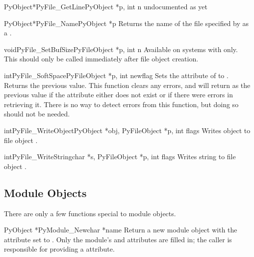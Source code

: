 \documentclass{manual}
\begin{document}
\begin{cfuncdesc}{PyObject*}{PyFile_GetLine}{PyObject *p, int n}
undocumented as yet
\end{cfuncdesc}

\begin{cfuncdesc}{PyObject*}{PyFile_Name}{PyObject *p}
Returns the name of the file specified by  as a 
.
\end{cfuncdesc}

\begin{cfuncdesc}{void}{PyFile_SetBufSize}{PyFileObject *p, int n}
Available on systems with  only.  This should
only be called immediately after file object creation.
\end{cfuncdesc}

\begin{cfuncdesc}{int}{PyFile_SoftSpace}{PyFileObject *p, int newflag}
Sets the  attribute of  to .
Returns the previous value.  This function clears any errors, and will
return  as the previous value if the attribute either does not
exist or if there were errors in retrieving it.  There is no way to
detect errors from this function, but doing so should not be needed.
\end{cfuncdesc}

\begin{cfuncdesc}{int}{PyFile_WriteObject}{PyObject *obj, PyFileObject *p,
                                           int flags}
Writes object  to file object .
\end{cfuncdesc}

\begin{cfuncdesc}{int}{PyFile_WriteString}{char *s, PyFileObject *p,
                                           int flags}
Writes string  to file object .
\end{cfuncdesc}


\subsection{Module Objects \label{moduleObjects}}

There are only a few functions special to module objects.

\begin{cfuncdesc}{PyObject *}{PyModule_New}{char *name}
Return a new module object with the  attribute set to 
.  Only the module's  and 
attributes are filled in; the caller is responsible for providing a
 attribute.
\end{cfuncdesc}
\end{document}
